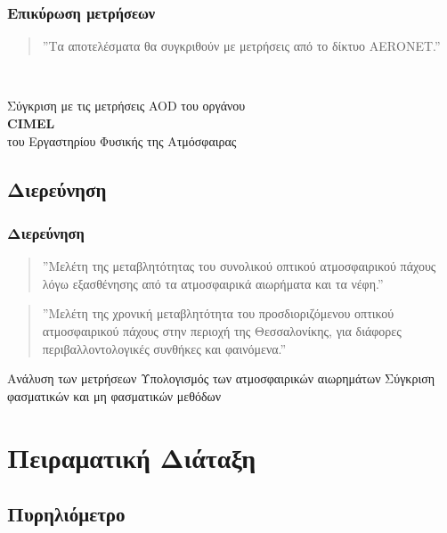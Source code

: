 \documentclass[noamsthm,12pt]{beamer}
\begin{document}
\begin{frame}
	\frametitle{Επικύρωση μετρήσεων}
	\begin{quote}
		\justifying
		''Τα αποτελέσματα θα συγκριθούν με μετρήσεις από το δίκτυο ΑΕRΟΝΕΤ.''		
	\end{quote}
	\hfill
	\ \\
	\hfill
	\begin{outline}
		\1 Σύγκριση με τις μετρήσεις AOD του οργάνου\\
		\hfill \textbf{CIMEL} \hfill \phantom{s} \\του Εργαστηρίου Φυσικής της Ατμόσφαιρας
	\end{outline}
\end{frame}


\subsection{Διερεύνηση}

\begin{frame}
	\frametitle{Διερεύνηση}
	\begin{quote}
	\justifying
	''Μελέτη της μεταβλητότητας του συνολικού οπτικού ατμοσφαιρικού πάχους λόγω εξασθένησης από τα ατμοσφαιρικά αιωρήματα και τα νέφη.''
	\end{quote}

	\begin{quote}
	\justifying
	''Μελέτη της χρονική μεταβλητότητα του προσδιοριζόμενου οπτικού ατμοσφαιρικού πάχους στην περιοχή της Θεσσαλονίκης, για διάφορες περιβαλλοντολογικές συνθήκες και φαινόμενα.''
	\end{quote}
	\hfill
	\begin{outline}	
		\1 Ανάλυση των μετρήσεων
			\2[] Υπολογισμός των ατμοσφαιρικών αιωρημάτων
		\1 Σύγκριση φασματικών και μη φασματικών μεθόδων
		\end{outline}

\end{frame}


\section{Πειραματική Διάταξη}

\subsection[Πυρηλιόμετρο]{Πυρηλιόμετρο}
\end{document}

